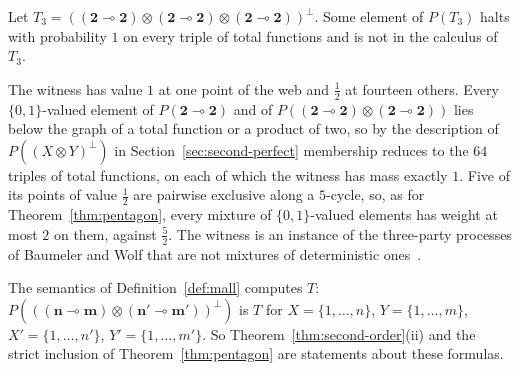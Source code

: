 \begin{proposition}
\label{prop:t3}
Let $T_3 = ((\mathbf{2} \multimap \mathbf{2}) \otimes (\mathbf{2}
\multimap \mathbf{2}) \otimes (\mathbf{2} \multimap \mathbf{2}))^{\perp}$.
Some element of $P(T_3)$ halts with probability $1$ on every triple of
total functions and is not in the calculus of $T_3$.
\end{proposition}

\noindent
The witness has value $1$ at one point of the web and $\tfrac12$ at
fourteen others. Every $\{0,1\}$-valued element of
$P(\mathbf{2} \multimap \mathbf{2})$ and of
$P((\mathbf{2} \multimap \mathbf{2}) \otimes (\mathbf{2} \multimap
\mathbf{2}))$ lies below the graph of a total function or a product of
two, so by the description of $P((X \otimes Y)^{\perp})$ in
Section~\ref{sec:second-perfect} membership reduces to the $64$ triples
of total functions, on each of which the witness has mass exactly $1$.
Five of its points of value $\tfrac12$ are pairwise exclusive along a
$5$-cycle, so, as for Theorem~\ref{thm:pentagon}, every mixture of
$\{0,1\}$-valued elements has weight at most $2$ on them, against
$\tfrac52$. The witness is an instance of the three-party processes of
Baumeler and Wolf that are not mixtures of deterministic
ones~\cite{baumeler-wolf2016}.

The semantics of Definition~\ref{def:mall} computes $T$:
$P(((\mathbf{n} \multimap \mathbf{m}) \otimes (\mathbf{n'} \multimap
\mathbf{m'}))^{\perp})$ is $T$ for $X = \{1,\dots,n\}$, $Y =
\{1,\dots,m\}$, $X' = \{1,\dots,n'\}$, $Y' = \{1,\dots,m'\}$.
So Theorem~\ref{thm:second-order}(ii) and the strict inclusion of
Theorem~\ref{thm:pentagon} are statements about these
formulas.

